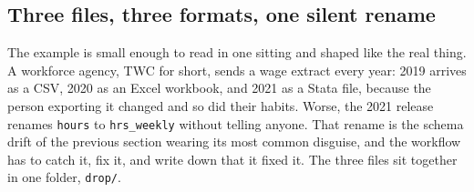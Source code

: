 \documentclass[
    a4paper,
    fontsize=10pt,
    twoside=true,
    numbers=noenddot,
]{kaobook}
\begin{document}
\subsection{Three files, three formats, one silent rename}
The example is small enough to read in one sitting and shaped like the real thing. A workforce agency, TWC for short, sends a wage extract every year: 2019 arrives as a CSV, 2020 as an Excel workbook, and 2021 as a Stata file, because the person exporting it changed and so did their habits. Worse, the 2021 release renames \texttt{hours} to \texttt{hrs\_weekly} without telling anyone. That rename is the schema drift of the previous section wearing its most common disguise, and the workflow has to catch it, fix it, and write down that it fixed it. The three files sit together in one folder, \texttt{drop/}.
\end{document}
